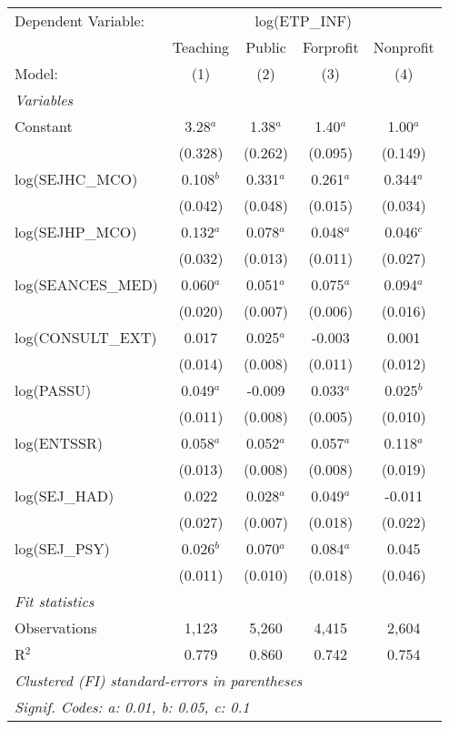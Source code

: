 
\begingroup
\centering
\begin{tabular}{lcccc}
   \tabularnewline \midrule \midrule
   Dependent Variable: & \multicolumn{4}{c}{log(ETP\_INF)}\\
                      & Teaching    & Public      & Forprofit   & Nonprofit \\   
   Model:             & (1)         & (2)         & (3)         & (4)\\  
   \midrule
   \emph{Variables}\\
   Constant           & 3.28$^{a}$  & 1.38$^{a}$  & 1.40$^{a}$  & 1.00$^{a}$\\   
                      & (0.328)     & (0.262)     & (0.095)     & (0.149)\\   
   log(SEJHC\_MCO)    & 0.108$^{b}$ & 0.331$^{a}$ & 0.261$^{a}$ & 0.344$^{a}$\\   
                      & (0.042)     & (0.048)     & (0.015)     & (0.034)\\   
   log(SEJHP\_MCO)    & 0.132$^{a}$ & 0.078$^{a}$ & 0.048$^{a}$ & 0.046$^{c}$\\   
                      & (0.032)     & (0.013)     & (0.011)     & (0.027)\\   
   log(SEANCES\_MED)  & 0.060$^{a}$ & 0.051$^{a}$ & 0.075$^{a}$ & 0.094$^{a}$\\   
                      & (0.020)     & (0.007)     & (0.006)     & (0.016)\\   
   log(CONSULT\_EXT)  & 0.017       & 0.025$^{a}$ & -0.003      & 0.001\\   
                      & (0.014)     & (0.008)     & (0.011)     & (0.012)\\   
   log(PASSU)         & 0.049$^{a}$ & -0.009      & 0.033$^{a}$ & 0.025$^{b}$\\   
                      & (0.011)     & (0.008)     & (0.005)     & (0.010)\\   
   log(ENTSSR)        & 0.058$^{a}$ & 0.052$^{a}$ & 0.057$^{a}$ & 0.118$^{a}$\\   
                      & (0.013)     & (0.008)     & (0.008)     & (0.019)\\   
   log(SEJ\_HAD)      & 0.022       & 0.028$^{a}$ & 0.049$^{a}$ & -0.011\\   
                      & (0.027)     & (0.007)     & (0.018)     & (0.022)\\   
   log(SEJ\_PSY)      & 0.026$^{b}$ & 0.070$^{a}$ & 0.084$^{a}$ & 0.045\\   
                      & (0.011)     & (0.010)     & (0.018)     & (0.046)\\   
   \midrule
   \emph{Fit statistics}\\
   Observations       & 1,123       & 5,260       & 4,415       & 2,604\\  
   R$^2$              & 0.779       & 0.860       & 0.742       & 0.754\\  
   \midrule \midrule
   \multicolumn{5}{l}{\emph{Clustered (FI) standard-errors in parentheses}}\\
   \multicolumn{5}{l}{\emph{Signif. Codes: a: 0.01, b: 0.05, c: 0.1}}\\
\end{tabular}
\par\endgroup


